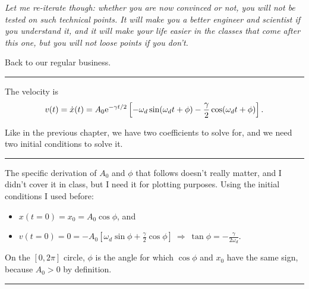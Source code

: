 \documentclass[11pt]{article}
\providecommand{\tightlist}{%
      \setlength{\itemsep}{0pt}\setlength{\parskip}{0pt}}
\begin{document}
\emph{Let me re-iterate though: whether you are now convinced or not,
you will not be tested on such technical points. It will make you a
better engineer and scientist if you understand it, and it will make
your life easier in the classes that come after this one, but you will
not loose points if you don't.}

Back to our regular business.

\begin{center}\rule{0.5\linewidth}{\linethickness}\end{center}

    The velocity is
\[ v(t) = \dot x(t) = A_0\textrm{e}^{- \gamma t/2}\left[-\omega_d\sin(\omega_d t + \phi) - \frac{\gamma}{2}\cos(\omega_dt +\phi)\right].\]

    Like in the previous chapter, we have two coefficients to solve for, and
we need two initial conditions to solve it.

\begin{center}\rule{0.5\linewidth}{\linethickness}\end{center}

The specific derivation of \(A_0\) and \(\phi\) that follows doesn't
really matter, and I didn't cover it in class, but I need it for
plotting purposes. Using the initial conditions I used before:

\begin{itemize}
\tightlist
\item
  \(x(t=0) = x_0 = A_0\cos\phi\), and
\item
  \(v(t=0) = 0 = -A_0\left[\omega_d\sin\phi + \frac{\gamma}{2}\cos\phi\right]\ \Rightarrow\ \tan\phi = -\frac\gamma{2\omega_d}\).
\end{itemize}

On the \([0, 2\pi]\) circle, \(\phi\) is the angle for which
\(\cos\phi\) and \(x_0\) have the same sign, because \(A_0>0\) by
definition.

\begin{center}\rule{0.5\linewidth}{\linethickness}\end{center}
\end{document}

